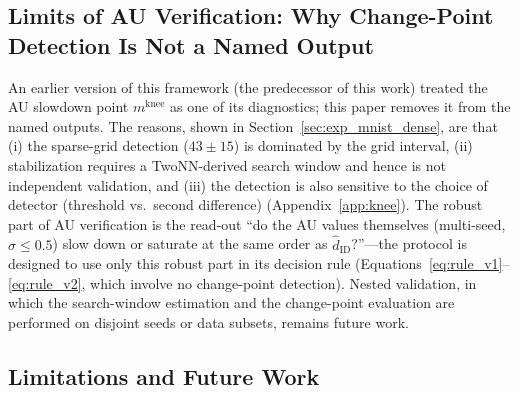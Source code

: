 \documentclass[make,article,submit,pdftex,moreauthors]{Definitions/mdpi}
\newcommand{\hatdID}{\hat{d}_{\mathrm{ID}}}
\newcommand{\mknee}{m^{\mathrm{knee}}}
\begin{document}
\subsection{Limits of AU Verification: Why Change-Point Detection Is Not a Named Output}\label{sec:disc_knee}

An earlier version of this framework (the predecessor of this work) treated
the AU slowdown point $\mknee$ as one of its diagnostics; this paper removes
it from the named outputs.
The reasons, shown in Section~\ref{sec:exp_mnist_dense}, are that
(i) the sparse-grid detection ($43 \pm 15$) is dominated by the grid
interval,
(ii) stabilization requires a TwoNN-derived search window and hence is not
independent validation, and
(iii) the detection is also sensitive to the choice of detector
(threshold vs.\ second difference) (Appendix~\ref{app:knee}).
The robust part of AU verification is the read-out ``do the AU values
themselves (multi-seed, $\sigma \leq 0.5$) slow down or saturate at the same
order as $\hatdID$?''---the protocol is designed to use only this robust
part in its decision rule
(Equations~\eqref{eq:rule_v1}--\eqref{eq:rule_v2}, which involve no
change-point detection).
Nested validation, in which the search-window estimation and the
change-point evaluation are performed on disjoint seeds or data subsets,
remains future work.

\subsection{Limitations and Future Work}\label{sec:disc_limitation}
\end{document}

